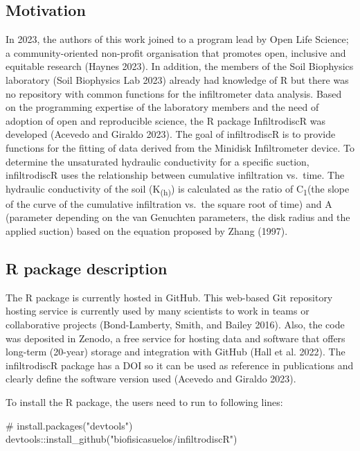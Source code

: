 \documentclass[
]{article}
\newenvironment{Shaded}{\begin{snugshade}}{\end{snugshade}}
\newcommand{\CommentTok}[1]{\textcolor[rgb]{0.37,0.37,0.37}{#1}}
\newcommand{\FunctionTok}[1]{\textcolor[rgb]{0.28,0.35,0.67}{#1}}
\newcommand{\NormalTok}[1]{\textcolor[rgb]{0.00,0.23,0.31}{#1}}
\newcommand{\SpecialCharTok}[1]{\textcolor[rgb]{0.37,0.37,0.37}{#1}}
\newcommand{\StringTok}[1]{\textcolor[rgb]{0.13,0.47,0.30}{#1}}
\begin{document}
\hypertarget{motivation}{%
\subsection{Motivation}\label{motivation}}

In 2023, the authors of this work joined to a program lead by Open Life
Science; a community-oriented non-profit organisation that promotes
open, inclusive and equitable research (Haynes 2023). In addition, the
members of the Soil Biophysics laboratory (Soil Biophysics Lab 2023)
already had knowledge of R but there was no repository with common
functions for the infiltrometer data analysis. Based on the programming
expertise of the laboratory members and the need of adoption of open and
reproducible science, the R package InfiltrodiscR was developed (Acevedo
and Giraldo 2023). The goal of infiltrodiscR is to provide functions for
the fitting of data derived from the Minidisk Infiltrometer device. To
determine the unsaturated hydraulic conductivity for a specific suction,
infiltrodiscR uses the relationship between cumulative infiltration
vs.~time. The hydraulic conductivity of the soil (K\textsubscript{(h)})
is calculated as the ratio of C\textsubscript{1}(the slope of the curve
of the cumulative infiltration vs.~the square root of time) and A
(parameter depending on the van Genuchten parameters, the disk radius
and the applied suction) based on the equation proposed by Zhang (1997).

\hypertarget{r-package-description}{%
\subsection{R package description}\label{r-package-description}}

The R package is currently hosted in GitHub. This web-based Git
repository hosting service is currently used by many scientists to work
in teams or collaborative projects (Bond-Lamberty, Smith, and Bailey
2016). Also, the code was deposited in Zenodo, a free service for
hosting data and software that offers long-term (20-year) storage and
integration with GitHub (Hall et al. 2022). The infiltrodiscR package
has a DOI so it can be used as reference in publications and clearly
define the software version used (Acevedo and Giraldo 2023).

To install the R package, the users need to run to following lines:

\begin{Shaded}
\begin{Highlighting}[]
\CommentTok{\# install.packages("devtools")}
\NormalTok{devtools}\SpecialCharTok{::}\FunctionTok{install\_github}\NormalTok{(}\StringTok{"biofisicasuelos/infiltrodiscR"}\NormalTok{)}
\end{Highlighting}
\end{Shaded}
\end{document}
